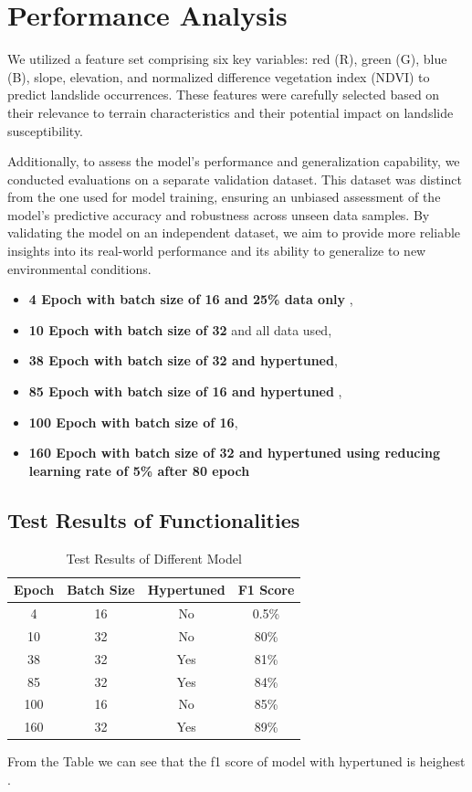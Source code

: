 \documentclass[12pt,a4paper]{report}
\begin{document}
	\section{Performance Analysis}{
		We utilized a feature set comprising six key variables: red (R), green (G), blue (B), slope, elevation, and normalized difference vegetation index (NDVI) to predict landslide occurrences. These features were carefully selected based on their relevance to terrain characteristics and their potential impact on landslide susceptibility.

Additionally, to assess the model's performance and generalization capability, we conducted evaluations on a separate validation dataset. This dataset was distinct from the one used for model training, ensuring an unbiased assessment of the model's predictive accuracy and robustness across unseen data samples. By validating the model on an independent dataset, we aim to provide more reliable insights into its real-world performance and its ability to generalize to new environmental conditions.

 	\begin{itemize}
    \item \textbf{4 Epoch with batch size of 16 and 25\% data only} , 
    \item \textbf{10 Epoch with batch size of 32} and all data used, 
    \item \textbf{38 Epoch with batch size of 32 and hypertuned},
    \item \textbf{85 Epoch with batch size of 16 and hypertuned },
    \item \textbf{100 Epoch with batch size of 16},
    \item \textbf{160 Epoch with batch size of 32 and hypertuned using reducing learning rate of 5\% after 80 epoch}
\end{itemize}
	\label{Test Results of Functionalities}
	\subsection{Test Results of Functionalities}
	\begin{table}[h]
    \centering
    \begin{tabular}{|c|c|c|c|}
        \hline
        \textbf{Epoch } & \textbf{Batch Size} & \textbf{Hypertuned} & \textbf{F1 Score} \\
        \hline
        4 & 16 & No & 0.5\% \\
        \hline
        10 & 32 & No & 80\% \\
        \hline
        38 & 32 & Yes & 81\% \\
        \hline
        85 & 32 & Yes & 84\% \\
        \hline
        100 & 16 & No & 85\% \\
        \hline
        160 & 32 & Yes & 89\% \\
        \hline
    \end{tabular}
    \caption{Test Results of Different Model}
    \label{tab:Test Results of Different Model}
\end{table}
From the Table we can see that the f1 score of model with hypertuned is heighest .	
	}	
\newpage
\end{document}
